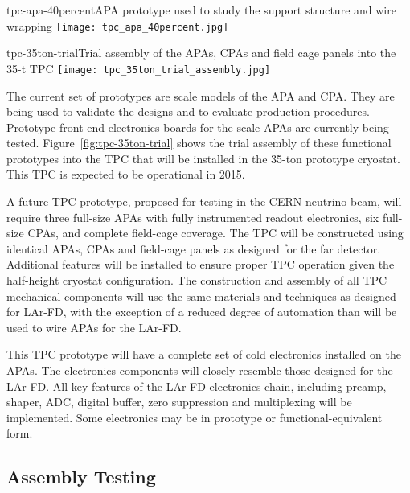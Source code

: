 \begin{cdrfigure}{tpc-apa-40percent}{APA prototype used to study the support structure and wire wrapping}
\texttt{[image: tpc\_apa\_40percent.jpg]}
\end{cdrfigure}

\begin{cdrfigure}{tpc-35ton-trial}{Trial assembly of the APAs, CPAs and field cage panels into the 35-t TPC}
\texttt{[image: tpc\_35ton\_trial\_assembly.jpg]}
\end{cdrfigure}

The %
current set of prototypes are scale models of the APA and CPA. They are being used to validate the designs and to evaluate production procedures. Prototype front-end electronics boards for the scale APAs are currently being tested. Figure~\ref{fig:tpc-35ton-trial} shows the trial assembly of these functional prototypes into the TPC that will be installed in the 35-ton prototype cryostat. This TPC is expected to be operational in 2015.

A future  TPC prototype, proposed for testing in the CERN neutrino beam, will require three full-size APAs with fully instrumented readout electronics, six full-size CPAs, and complete field-cage coverage. The TPC will be constructed using identical APAs, CPAs and field-cage panels as designed for the far detector. Additional features will be installed to ensure proper TPC operation given the half-height cryostat configuration. The construction and assembly of all TPC mechanical components will use the same materials and techniques as designed for LAr-FD, with the exception of a reduced degree of automation than will be used to wire APAs for the LAr-FD. 

This TPC prototype will have a complete set of cold electronics installed on the APAs. The electronics components will closely resemble those designed for the LAr-FD. All key features of the LAr-FD electronics chain, including preamp, shaper, ADC, digital buffer, zero suppression and multiplexing will be implemented. Some electronics may be in prototype or functional-equivalent form.


\subsection{Assembly Testing}
\label{sec:v5-tpc-checkout-test}


